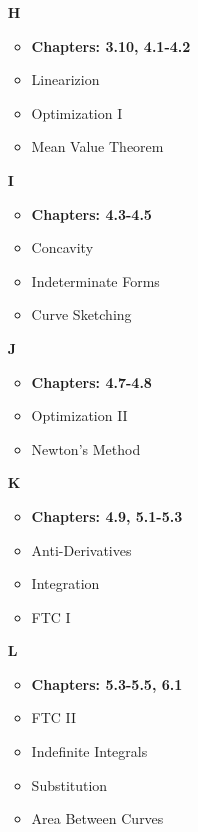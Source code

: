 \documentclass{letter}
\begin{document}
	\begin{minipage}[t]{0.5\textwidth}
		\begin{itemize}
			\item[\large \textbf{H}]
			\begin{itemize}
				\item \textbf{Chapters: 3.10, 4.1-4.2}
				\item Linearizion
				\item Optimization I
				\item Mean Value Theorem\\
			\end{itemize}
			\item[\large \textbf{I}]
			\begin{itemize}
				\item \textbf{Chapters: 4.3-4.5}
				\item Concavity
				\item Indeterminate Forms
				\item Curve Sketching\\
			\end{itemize}
			\item[\large \textbf{J}]
			\begin{itemize}
				\item \textbf{Chapters: 4.7-4.8}
				\item Optimization II
				\item Newton's Method\\
			\end{itemize}
			\item[\large \textbf{K}]
			\begin{itemize}
				\item \textbf{Chapters: 4.9, 5.1-5.3}
				\item Anti-Derivatives
				\item Integration
				\item FTC I\\
			\end{itemize}
			\item[\large \textbf{L}]
			\begin{itemize}
				\item \textbf{Chapters: 5.3-5.5, 6.1}
				\item FTC II
				\item Indefinite Integrals
				\item Substitution
				\item Area Between Curves
			\end{itemize}
		\end{itemize}
	\end{minipage}
\end{document}
